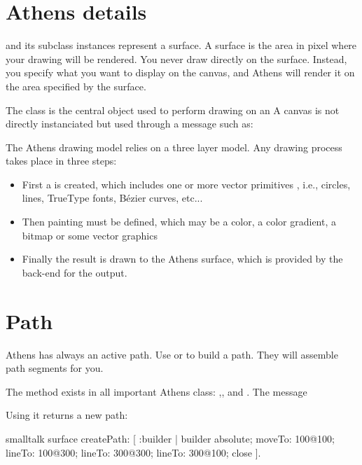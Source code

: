 \documentclass[10pt,twoside,english]{_support/latex/sbabook/sbabook}
\begin{document}
\section{Athens details}
 and its subclass  instances represent a surface.
A surface is the area in pixel where your drawing will be rendered.
You  never draw directly on the surface.
Instead, you specify what you want to display on the canvas, and Athens will render it on the area specified by the surface.

The class  is the central object used to perform drawing on an 
A canvas is not directly instanciated but used through a message such as:

The Athens drawing model relies on a three layer model. Any drawing process
takes place in three steps:

\begin{itemize}
    \item First a  is created, which includes one or more vector primitives , i.e., circles, lines, TrueType fonts, B\'{e}zier curves, etc...
    \item Then painting must be defined, which may be a color, a color gradient, a bitmap or some vector graphics
    \item Finally the result is drawn to the Athens surface, which is provided by the back-end for the output.
\end{itemize}

\section{Path}
Athens has always an active path.
Use  or  to build a path.
They will assemble path segments for you.

The method  exists in all important Athens class: ,, and  .
The message 

Using it returns a new path:
\begin{displaycode}{smalltalk}
surface createPath: [ :builder |
 builder
  absolute;
  moveTo: 100@100;
  lineTo: 100@300;
  lineTo: 300@300;
  lineTo: 300@100;
  close ].
\end{displaycode}
\end{document}
